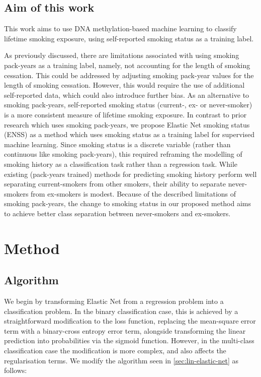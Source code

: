\documentclass{article} %
\begin{document}
\subsection{Aim of this work}
This work aims to use DNA methylation-based machine learning to classify lifetime smoking exposure, using self-reported smoking status as a training label.

As previously discussed, there are limitations associated with using smoking pack-years as a training label, namely, not accounting for the length of smoking cessation. This could be addressed by adjusting smoking pack-year values for the length of smoking cessation. However, this would require the use of additional self-reported data, which could also introduce further bias. As an alternative to smoking pack-years, self-reported smoking status (current-, ex- or never-smoker) is a more consistent measure of lifetime smoking exposure. In contrast to prior research which uses smoking pack-years, we propose Elastic Net smoking status (ENSS) as a method which uses smoking status as a training label for supervised machine learning.  Since smoking status is a discrete variable (rather than continuous like smoking pack-years), this required reframing the modelling of smoking history as a classification task rather than a regression task. While existing (pack-years trained) methods for predicting smoking history perform well separating current-smokers from other smokers, their ability to separate never-smokers from ex-smokers is modest. Because of the described limitations of smoking pack-years, the change to smoking status in our proposed method aims to achieve better class separation between never-smokers and ex-smokers.



\newpage
\section{Method}

\subsection{Algorithm} \label{sec:algorithm}
We begin by transforming Elastic Net from a regression problem into a classification problem. In the binary classification case, this is achieved by a straightforward modification to the loss function, replacing the mean-square error term with a binary-cross entropy error term, alongside transforming the linear prediction into probabilities via the sigmoid function. However, in the multi-class classification case the modification is more complex, and also affects the regularisation terms. We modify the algorithm seen in \ref{sec:lin-elastic-net} as follows:
\end{document}
